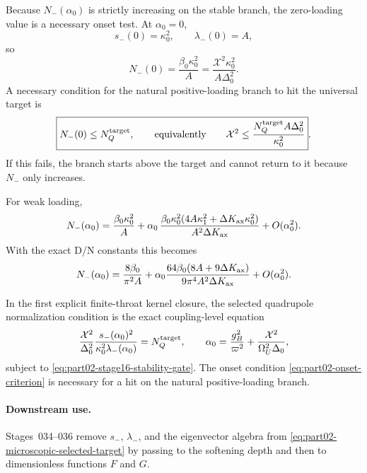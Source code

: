 Because \(N_-(\alpha_0)\) is strictly increasing on the stable branch, the zero-loading value is a necessary onset test.  At \(\alpha_0=0\),
\begin{equation}
s_-(0)=\kappa_0^2,
\qquad
\lambda_-(0)=A,
\end{equation}
so
\begin{equation}
\label{eq:part02-Nminus-zero}
\boxed{
N_-(0)=\frac{\beta_0\kappa_0^2}{A}
=
\frac{\mathcal{X}^2\kappa_0^2}{A\Delta_0^2}}.
\end{equation}
A necessary condition for the natural positive-loading branch to hit the universal target is
\begin{equation}
\label{eq:part02-onset-criterion}
\boxed{
N_-(0)\leq N_Q^{\rm target},
\qquad
\text{equivalently}\qquad
\mathcal{X}^2\leq \frac{N_Q^{\rm target}A\Delta_0^2}{\kappa_0^2}}.
\end{equation}
If this fails, the branch starts above the target and cannot return to it because \(N_-\) only increases.

For weak loading,
\begin{equation}
\label{eq:part02-weak-loading-expansion}
N_-(\alpha_0)
=
\frac{\beta_0\kappa_0^2}{A}
+
\alpha_0\,\frac{\beta_0\kappa_0^2(4A\kappa_1^2+\Delta K_{\rm ax}\kappa_0^2)}{A^2\Delta K_{\rm ax}}
+O(\alpha_0^2).
\end{equation}
With the exact D/N constants this becomes
\begin{equation}
N_-(\alpha_0)
=
\frac{8\beta_0}{\pi^2A}
+
\alpha_0\frac{64\beta_0(8A+9\Delta K_{\rm ax})}{9\pi^4A^2\Delta K_{\rm ax}}
+O(\alpha_0^2).
\end{equation}

\begin{theorem}
\label{thm:part02-microscopic-selected-test}
In the first explicit finite-throat kernel closure, the selected quadrupole normalization condition is the exact coupling-level equation
\begin{equation}
\label{eq:part02-microscopic-selected-target}
\frac{\mathcal{X}^2}{\Delta_0^2}\frac{s_-(\alpha_0)^2}{\kappa_0^2\lambda_-(\alpha_0)}=N_Q^{\rm target},
\qquad
\alpha_0=\frac{g_B^2}{\varpi^2}+\frac{\mathcal{X}^2}{\Omega_U^2\Delta_0},
\end{equation}
subject to \eqref{eq:part02-stage16-stability-gate}.  The onset condition \eqref{eq:part02-onset-criterion} is necessary for a hit on the natural positive-loading branch.
\end{theorem}

\paragraph{Downstream use.}
Stages~034--036 remove \(s_-\), \(\lambda_-\), and the eigenvector algebra from \eqref{eq:part02-microscopic-selected-target} by passing to the softening depth and then to dimensionless functions \(F\) and \(G\).

